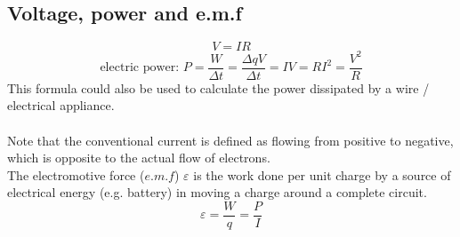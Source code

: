 \subsection{Voltage, power and e.m.f}
\[V=IR\]
\[\text{electric power: } P=\dfrac{W}{\Delta t}=\dfrac{\Delta qV}{\Delta t} = IV=RI^2=\dfrac{V^2}{R}\]
This formula could also be used to calculate the power dissipated by a wire / electrical appliance.\\\\
Note that the conventional current is defined as flowing from positive to negative, which is opposite to the actual flow of electrons.\\
The electromotive force ($e.m.f$) $\varepsilon$ is the work done per unit charge by a source of electrical energy (e.g. battery) in moving a charge around a complete circuit.
\[\varepsilon = \dfrac{W}{q}=\dfrac{P}{I}\]

